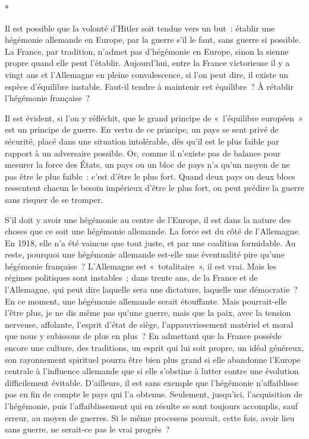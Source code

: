 \documentclass[french,twoside]{book} %
\begin{document}
\begin{center}
*\end{center}
\noindent Il est possible que la volonté d'Hitler soit tendue vers un but : établir une hégémonie allemande en Europe, par la guerre s'il le faut, sans guerre si possible. La France, par tradition, n'admet pas d'hégémonie en Europe, sinon la sienne propre quand elle peut l'établir. Aujourd'hui, entre la France victo­rieuse il y a vingt ans et l'Allemagne en pleine convalescence, si l'on peut dire, il existe un espèce d'équilibre instable. Faut-il tendre à maintenir cet équilibre ? À rétablir l'hégémonie française ?\par
Il est évident, si l'on y réfléchit, que le grand principe de « l'équilibre européen » est un principe de guerre. En vertu de ce principe, un pays se sent privé de sécurité, placé dans une situation intolérable, dès qu'il est le plus faible par rapport à un adversaire possible. Or, comme il n'existe pas de balance pour mesurer la force des États, un pays ou un bloc de pays n'a qu'un moyen de ne pas être le plus faible : c'est d'être le plus fort. Quand deux pays ou deux blocs ressentent chacun le besoin impérieux d'être le plus fort, on peut prédire la guerre sans risquer de se tromper.\par
S'il doit y avoir une hégémonie au centre de l'Europe, il est dans la nature des choses que ce soit une hégémonie allemande. La force est du côté de l'Allemagne. En 1918, elle n'a été vaincue que tout juste, et par une coalition formidable. Au reste, pourquoi une hégémonie allemande est-elle une éven­tualité pire qu'une hégémonie française ? L'Allemagne est « totalitaire », il est vrai. Mais les régimes politiques sont instables ; dans trente ans, de la France et de l'Allemagne, qui peut dire laquelle sera une dictature, laquelle une démocratie ? En ce moment, une hégémonie allemande serait étouffante. Mais pourrait-elle l'être plus, je ne dis même pas qu'une guerre, mais que la paix, avec la tension nerveuse, affolante, l'esprit d'état de siège, l'appauvrissement matériel et moral que nous y subissons de plus en plus ? En admettant que la France possède encore une culture, des traditions, un esprit qui lui soit propre, un idéal généreux, son rayonnement spirituel pourra être bien plus grand si elle abandonne l'Europe centrale à l'influence allemande que si elle s'obstine à lutter contre une évolution difficilement évitable. D'ailleurs, il est sans exemple que l'hégémonie n'affaiblisse pas en fin de compte le pays qui l'a obtenue. Seulement, jusqu'ici, l'acquisition de l'hégémonie, puis l'affaiblisse­ment qui en résulte se sont toujours accomplis, sauf erreur, au moyen de guerres. Si le même processus pouvait, cette fois, avoir lieu sans guerre, ne serait-ce pas le vrai progrès ?\par
\end{document}
